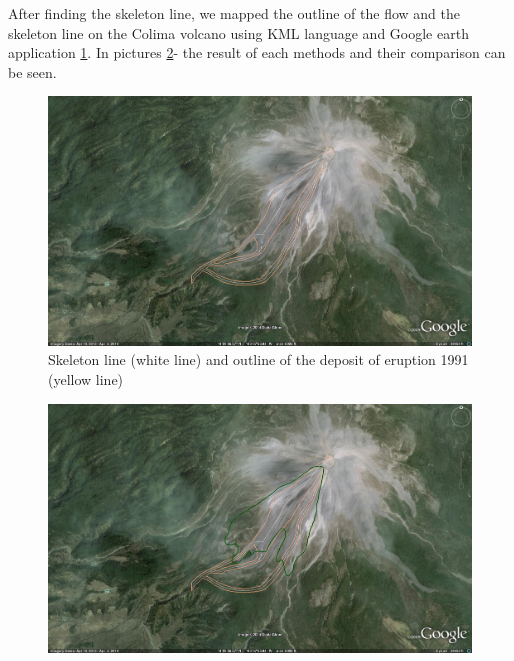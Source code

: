 \documentclass[letterpaper,10pt]{article}
\begin{document}
\newpage

After finding the skeleton line, we mapped the outline of the flow and the skeleton line on the Colima volcano 
using KML language and Google earth application \ref{skel_outline}. In pictures \ref{phasefieldfig}-
the result of each methods and their comparison can be seen. 

\begin{figure}[H]
\centerline{\includegraphics[width=\textwidth]{IMAGES/skeleton_outline.jpg}}
\caption{Skeleton line (white line) and outline of the deposit of eruption 1991 (yellow line)}
\label{skel_outline}
\end{figure}

\begin{figure}[H]
\centerline{\includegraphics[width=\textwidth]{IMAGES/phasefield.jpg}}
\caption{}
\label{phasefieldfig}
\end{figure}
\end{document}
